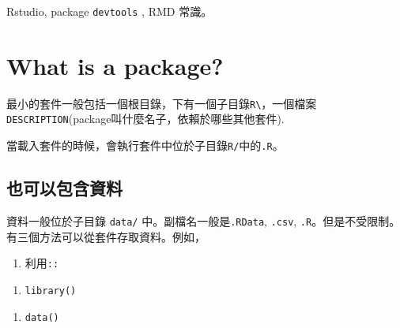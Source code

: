 \documentclass[]{book}
\newenvironment{Shaded}{\begin{snugshade}}{\end{snugshade}}
\newcommand{\KeywordTok}[1]{\textcolor[rgb]{0.13,0.29,0.53}{\textbf{#1}}}
\newcommand{\NormalTok}[1]{#1}
\newcommand{\OperatorTok}[1]{\textcolor[rgb]{0.81,0.36,0.00}{\textbf{#1}}}
\newcommand{\StringTok}[1]{\textcolor[rgb]{0.31,0.60,0.02}{#1}}
\providecommand{\tightlist}{%
  \setlength{\itemsep}{0pt}\setlength{\parskip}{0pt}}
\theoremstyle{definition}
\theoremstyle{definition}
\theoremstyle{definition}
\theoremstyle{remark}
\begin{document}
Rstudio, package \texttt{devtools} , RMD 常識。

\hypertarget{what-is-a-package}{%
\section{What is a package?}\label{what-is-a-package}}

最小的套件一般包括一個根目錄，下有一個子目錄\texttt{R\textbackslash{}}，一個檔案
\texttt{DESCRIPTION}(package叫什麼名子，依賴於哪些其他套件).

當載入套件的時候，會執行套件中位於子目錄\texttt{R/}中的\texttt{.R}。

\subsection{也可以包含資料}

資料一般位於子目錄 \texttt{data/} 中。副檔名一般是\texttt{.RData},
\texttt{.csv}, \texttt{.R}。但是不受限制。\\
有三個方法可以從套件存取資料。例如，

\begin{enumerate}
\def\labelenumi{\arabic{enumi}.}
\tightlist
\item
  利用\texttt{::}
\end{enumerate}

\begin{Shaded}
\end{Shaded}

\begin{enumerate}
\def\labelenumi{\arabic{enumi}.}
\setcounter{enumi}{1}
\tightlist
\item
  \texttt{library()}
\end{enumerate}

\begin{Shaded}
\end{Shaded}

\begin{enumerate}
\def\labelenumi{\arabic{enumi}.}
\setcounter{enumi}{2}
\tightlist
\item
  \texttt{data()}
\end{enumerate}
\end{document}
